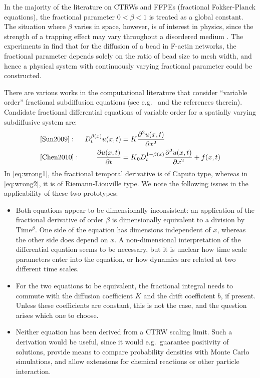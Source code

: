 \documentclass[a4paper,12pt]{article}
\numberwithin{equation}{section}
\theoremstyle{plain}
\theoremstyle{definition}
\theoremstyle{remark}
\numberwithin{equation}{section}
\newcommand{\1}{\mathbf 1}
\begin{document}
In the majority of the literature on CTRWs and FFPEs (fractional Fokker-Planck
equations), the
fractional parameter $0 < \beta < 1$ is treated as a global constant.  The
situation where $\beta$ varies in space, however, is of interest in physics,
since the strength of a trapping effect may vary throughout a disordered
medium
\cite{Chechkin2005a,Korabel2010,Stickler2011,Fedotov2012,StrakaFedotov14}.
The experiments in \cite{Wong04} find that for the diffusion of a bead in
F-actin networks, the fractional parameter depends solely on the ratio of
bead size to mesh width, and hence a physical system with continuously varying
fractional parameter could be constructed.

There are various works in the computational literature that consider ``variable
order'' fractional subdiffusion equations (see e.g.\ \cite{Chen2010,Sun2009} and
the references therein). Candidate fractional differential equations of
variable order for a spatially varying subdiffusive system are:
\begin{align}
\label{eq:wrong1}
  &\cite[Eq.(8)]{Sun2009}:
  &
  D_t^{\beta(x)} u(x,t) &= K \frac{\partial^2 u(x,t)}{\partial x^2}
  \\
  \label{eq:wrong2}
  &\cite[Eq.(1.2)]{Chen2010}:
  &
  \frac{\partial u(x,t)}{\partial t} &= K {_0 D_t^{1-\beta(x)}}
  \frac{\partial^2 u(x,t)}{\partial x^2} + f(x,t)
\end{align}
In \eqref{eq:wrong1}, the fractional temporal derivative is of Caputo type,
whereas in \eqref{eq:wrong2}, it is of Riemann-Liouville type.
We note the following issues in the applicability of these two prototypes:
\begin{itemize}
  \item
  Both equations appear to be dimensionally inconsistent: an application of the
  fractional derivative of order $\beta$ is dimensionally equivalent to a
  division by Time$^{\beta}$. One side of the equation has dimensions
  independent of $x$, whereas the other side does depend on $x$.  A
  non-dimensional interpretation of the differential equation seems to be
  necessary, but it is unclear how time scale parameters enter into the
  equation, or how dynamics are related at two different time scales.
  \item
  For the two equations to be equivalent, the fractional integral needs to
  commute with the diffusion coefficient $K$ and the drift coefficient $b$,
  if present.  Unless these coefficients are constant, this is not the case,
  and the question arises which one to choose.
  \item
  Neither equation has been derived from a CTRW scaling limit. Such a derivation
  would be useful, since it would e.g.\ guarantee positivity of solutions,
  provide means to compare probability densities with Monte Carlo simulations,
  and allow extensions for chemical reactions or other particle interaction.
\end{itemize}
\end{document}
